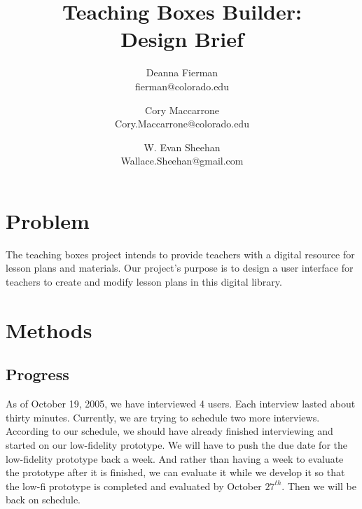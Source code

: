 \documentclass[12pt,titlepage]{article}
\title{Teaching Boxes Builder: \\ Design Brief}
\author{Deanna Fierman  \\ \small{fierman@colorado.edu} \and
        Cory Maccarrone \\ \small{Cory.Maccarrone@colorado.edu} \and
		W. Evan Sheehan \\ \small{Wallace.Sheehan@gmail.com}}
\newcommand{\blankpage}{\hfill\thispagestyle{empty}\pagebreak\addtocounter{page}{-1}}
\begin{document}
\maketitle

\blankpage

\tableofcontents
\cfoot{\hrule \thepage}
\pagebreak

\blankpage


\section{Problem}
The teaching boxes project intends to provide teachers with a digital resource
for lesson plans and materials. Our project's purpose is to design a user
interface for teachers to create and modify lesson plans in this digital
library.

\section{Methods}

\subsection{Progress}
As of October 19, 2005, we have interviewed 4 users. Each interview lasted about
thirty minutes.  Currently, we are trying to schedule two more interviews.
According to our schedule, we should have already finished interviewing and
started on our low-fidelity prototype. We will have to push the due date for the
low-fidelity prototype back a week. And rather than having a week to evaluate
the prototype after it is finished, we can evaluate it while we develop it so
that the low-fi prototype is completed and evaluated by October $27^{th}$. Then
we will be back on schedule.
\end{document}
